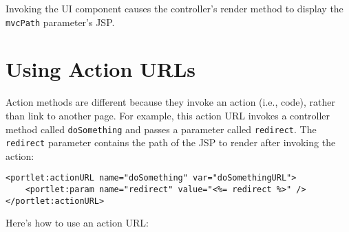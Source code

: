 Invoking the UI component causes the controller's render method to
display the \texttt{mvcPath} parameter's JSP.

\section{Using Action URLs}\label{using-action-urls}

Action methods are different because they invoke an action (i.e., code),
rather than link to another page. For example, this action URL invokes a
controller method called \texttt{doSomething} and passes a parameter
called \texttt{redirect}. The \texttt{redirect} parameter contains the
path of the JSP to render after invoking the action:

\begin{verbatim}
<portlet:actionURL name="doSomething" var="doSomethingURL">
    <portlet:param name="redirect" value="<%= redirect %>" />
</portlet:actionURL>
\end{verbatim}

Here's how to use an action URL:

